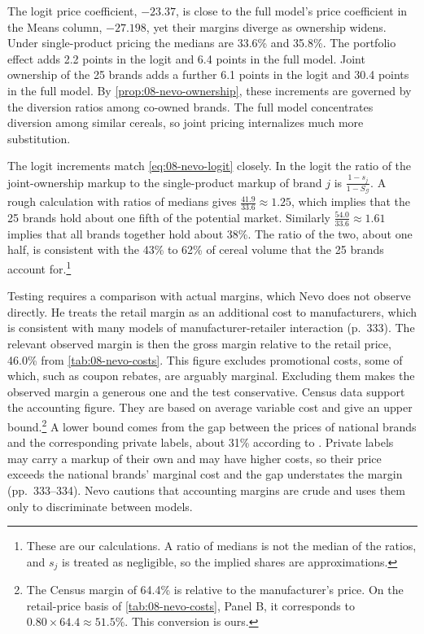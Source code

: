 The logit price coefficient, $-23.37$, is close to the full model's price coefficient in the Means column,
$-27.198$, yet their margins diverge as ownership widens. Under single-product pricing the medians are 33.6\% and 35.8\%. The portfolio effect adds 2.2
points in the logit and 6.4 points in the full model. Joint ownership of the 25 brands adds a further 6.1
points in the logit and 30.4 points in the full model. By \cref{prop:08-nevo-ownership}, these increments are
governed by the diversion ratios among co-owned brands. The full model concentrates diversion among similar
cereals, so joint pricing internalizes much more substitution.

The logit increments match \eqref{eq:08-nevo-logit} closely. In the logit the ratio of the joint-ownership
markup to the single-product markup of brand $j$ is $\frac{1-s_j}{1-S_{\mathcal{G}}}$. A rough calculation with
ratios of medians gives $\frac{41.9}{33.6} \approx 1.25$, which implies that the 25 brands hold about one fifth
of the potential market. Similarly $\frac{54.0}{33.6} \approx 1.61$ implies that all brands together hold
about 38\%. The ratio of the two, about one half, is consistent with the 43\% to 62\% of cereal volume that the
25 brands account for.\footnote{These are our calculations. A ratio of medians is not the median of the ratios,
and $s_j$ is treated as negligible, so the implied shares are approximations.}

 Testing requires a comparison with actual margins, which Nevo does not observe
directly. He treats the retail margin as an additional cost to manufacturers, which is consistent with many
models of manufacturer-retailer interaction (p.~333). The relevant observed margin is then the gross margin
relative to the retail price, 46.0\% from \cref{tab:08-nevo-costs}. This figure excludes promotional costs,
some of which, such as coupon rebates, are arguably marginal. Excluding them makes the observed margin a
generous one and the test conservative. Census data support the accounting figure. They are based on average
variable cost and give an upper bound.\footnote{The Census margin of 64.4\% is relative to the manufacturer's
price. On the retail-price basis of \cref{tab:08-nevo-costs}, Panel B, it corresponds to
$0.80 \times 64.4 \approx 51.5\%$. This conversion is ours.} A lower bound comes from the gap between the
prices of national brands and the corresponding private labels, about 31\% according to
\citet{Wongtrakool1994}. Private labels may carry a markup of their own and may have higher costs, so their
price exceeds the national brands' marginal cost and the gap understates the margin (pp.~333--334). Nevo
cautions that accounting margins are crude \citep{FisherMcGowan1983} and uses them only to discriminate
between models.

